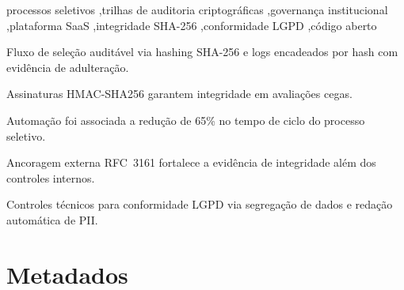 \documentclass[preprint,12pt,a4paper]{elsarticle}
\begin{document}
\begin{frontmatter}
\begin{keyword}
processos seletivos \sep trilhas de auditoria criptográficas \sep governança institucional \sep plataforma SaaS \sep integridade SHA-256 \sep conformidade LGPD \sep código aberto
\end{keyword}

\begin{highlights}
\item Fluxo de seleção auditável via hashing SHA-256 e logs encadeados por hash com evidência de adulteração.
\item Assinaturas HMAC-SHA256 garantem integridade em avaliações cegas.
\item Automação foi associada a redução de 65\% no tempo de ciclo do processo seletivo.
\item Ancoragem externa RFC~3161 fortalece a evidência de integridade além dos controles internos.
\item Controles técnicos para conformidade LGPD via segregação de dados e redação automática de PII.
\end{highlights}

\end{frontmatter}


\section*{Metadados}
\end{document}
